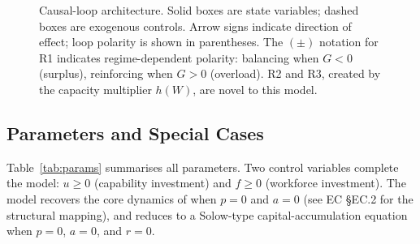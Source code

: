 \documentclass[msom,dblanonrev]{informs4}
\begin{document}
\begin{figure}
\FIGURE
{\usebox{\cldbox}}
{Causal-loop architecture. Solid boxes are state variables; dashed boxes are exogenous controls. Arrow signs indicate direction of effect; loop polarity is shown in parentheses. The $(\pm)$ notation for R1 indicates regime-dependent polarity: balancing when $G < 0$ (surplus), reinforcing when $G > 0$ (overload). R2 and R3, created by the capacity multiplier $h(W)$, are novel to this model.\label{fig:loops}}
{}
\end{figure}


\subsection{Parameters and Special Cases}\label{sec:model:params}

Table~\ref{tab:params} summarises all parameters. Two control variables complete the model: $u \geq 0$ (capability investment) and $f \geq 0$ (workforce investment). The model recovers the core dynamics of \citet{oliva2001cutting} when $p = 0$ and $a = 0$ (see EC \S EC.2 for the structural mapping), and reduces to a Solow-type capital-accumulation equation when $p = 0$, $a = 0$, and $r = 0$.
\end{document}
